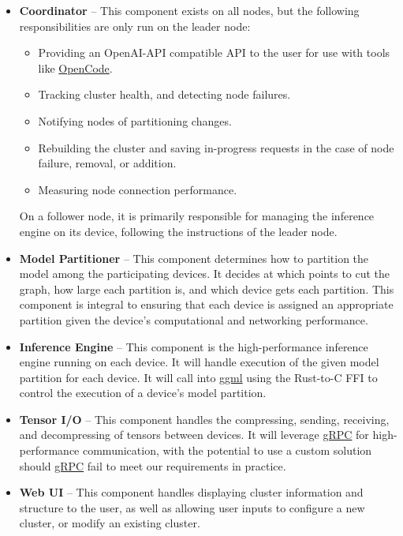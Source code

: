 \documentclass[12pt]{article}
\begin{document}
\begin{itemize}
	\item \textbf{Coordinator} -- This component exists on all nodes,
		but the following responsibilities are only run on the leader node:
		\begin{itemize}
			\item Providing an OpenAI-API compatible API to the user for use with tools like
				\href{https://opencode.ai/}{OpenCode}.
			\item Tracking cluster health, and detecting node failures.
			\item Notifying nodes of partitioning changes.
			\item Rebuilding the cluster and saving in-progress requests
				in the case of node failure, removal, or addition.
			\item Measuring node connection performance.
		\end{itemize}
		On a follower node, it is primarily responsible for managing the inference engine
		on its device, following the instructions of the leader node.

	\item \textbf{Model Partitioner} --
		This component determines how to partition the model among the participating devices. It
		decides at which points to cut the graph, how large each partition is, and which device gets
		each partition. This component is integral to ensuring that each device is assigned an appropriate
		partition given the device's computational and networking performance.

	\item \textbf{Inference Engine} --
		This component is the high-performance inference engine running on each device. It will handle
		execution of the given model partition for each device. It will call into
		\href{https://github.com/ggml-org/ggml}{ggml} using the Rust-to-C FFI to control the execution of a
		device's model partition.

	\item \textbf{Tensor I/O} --
		This component handles the compressing, sending, receiving, and decompressing of tensors between devices.
		It will leverage \href{https://grpc.io/}{gRPC} for high-performance communication, with the potential
		to use a custom solution should \href{https://grpc.io/}{gRPC} fail to meet our requirements in practice.

	\item \textbf{Web UI} --
		This component handles displaying cluster information and structure to the user, as well as allowing user
		inputs to configure a new cluster, or modify an existing cluster.
\end{itemize}
\end{document}
